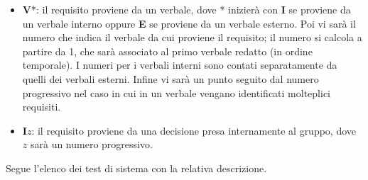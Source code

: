 \begin{itemize}
\begin{itemize}
        \item \textbf{V}*: il requisito proviene da un verbale, dove * inizierà con \textbf{I} se proviene da un verbale interno oppure \textbf{E} se proviene da un verbale esterno.
        Poi vi sarà il numero che indica il verbale da cui proviene il requisito; il numero si calcola a partire da 1, che sarà associato al primo verbale redatto (in ordine temporale). I numeri per i verbali interni sono contati separatamente da quelli dei verbali esterni. Infine vi sarà un punto seguito dal numero progressivo nel caso in cui in un verbale vengano identificati molteplici requisiti.
        \item \textbf{I}$z$: il requisito proviene da una decisione presa internamente al gruppo, dove $z$ sarà un numero progressivo.
    \end{itemize}
\end{itemize}

Segue l'elenco dei test di sistema con la relativa descrizione.




